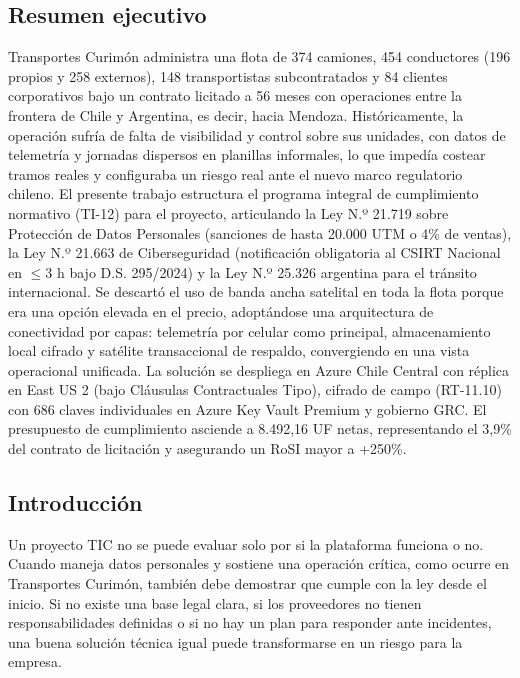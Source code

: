 \subsection{Resumen ejecutivo}\label{resumen-ejecutivo}

Transportes Curimón administra una flota de 374 camiones, 454 conductores (196 propios y 258 externos), 148 transportistas subcontratados y 84 clientes corporativos bajo un contrato licitado a 56 meses con operaciones entre la frontera de Chile y Argentina, es decir, hacia Mendoza. Históricamente, la operación sufría de falta de visibilidad y control sobre sus unidades, con datos de telemetría y jornadas dispersos en planillas informales, lo que impedía costear tramos reales y configuraba un riesgo real ante el nuevo marco regulatorio chileno. El presente trabajo estructura el programa integral de cumplimiento normativo (TI-12) para el proyecto, articulando la Ley N.º 21.719 sobre Protección de Datos Personales (sanciones de hasta 20.000 UTM o 4\% de ventas), la Ley N.º 21.663 de Ciberseguridad (notificación obligatoria al CSIRT Nacional en \(\le 3\text{ h}\) bajo D.S. 295/2024) y la Ley N.º 25.326 argentina para el tránsito internacional. Se descartó el uso de banda ancha satelital en toda la flota porque era una opción elevada en el precio, adoptándose una arquitectura de conectividad por capas: telemetría por celular como principal, almacenamiento local cifrado y satélite transaccional de respaldo, convergiendo en una vista operacional unificada. La solución se despliega en Azure Chile Central con réplica en East US 2 (bajo Cláusulas Contractuales Tipo), cifrado de campo (RT-11.10) con 686 claves individuales en Azure Key Vault Premium y gobierno GRC. El presupuesto de cumplimiento asciende a 8.492,16 UF netas, representando el 3,9\% del contrato de licitación y asegurando un RoSI mayor a +250\%.

\subsection{Introducción}\label{introducciuxf3n}

Un proyecto TIC no se puede evaluar solo por si la plataforma funciona o no. Cuando maneja datos personales y sostiene una operación crítica, como ocurre en Transportes Curimón, también debe demostrar que cumple con la ley desde el inicio. Si no existe una base legal clara, si los proveedores no tienen responsabilidades definidas o si no hay un plan para responder ante incidentes, una buena solución técnica igual puede transformarse en un riesgo para la empresa.


